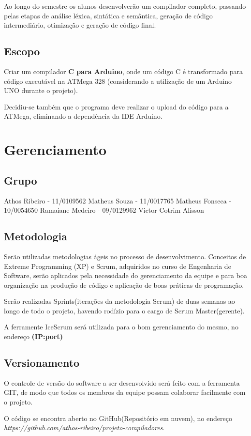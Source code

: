 \documentclass{abnt}
\begin{document}
    Ao longo do semestre os alunos desenvolverão um compilador completo, passando pelas etapas de análise léxica, sintática e semântica, geração de código intermediário, otimização e geração de código final.
    \section{Escopo}
Criar um compilador \textbf{C para Arduino}, onde um código C é transformado para código executável na ATMega 328 (considerando a utilização de um Arduino UNO durante o projeto).

Decidiu-se também que o programa deve realizar o upload do código para a ATMega, eliminando a dependência da IDE Arduino.

\chapter{Gerenciamento}
\section{Grupo}
    Athos Ribeiro - 11/0109562
    Matheus Souza - 11/0017765
    Matheus Fonseca - 10/0054650
    Ramaiane Medeiro - 09/0129962
    Victor Cotrim
    Alisson

\section{Metodologia}
Serão utilizadas metodologias ágeis no processo de desenvolvimento. Conceitos de Extreme Programming (XP) e Scrum, adquiridos no curso de Engenharia de Software, serão aplicados  pela necessidade do gerenciamento da equipe e para boa organização na produção de código e aplicação de boas práticas de programação.

Serão realizadas Sprints(iterações da metodologia Scrum) de duas semanas ao longo de todo o projeto, havendo rodízio para o cargo de Scrum Master(gerente).

A ferramente IceScrum será utilizada para o bom gerenciamento do mesmo, no endereço \textbf{(IP:port)}
\section{Versionamento}
O controle de versão do software a ser desenvolvido será feito com a ferramenta GIT, de modo que todos os membros da equipe possam colaborar facilmente com o projeto.

O código se encontra aberto no GitHub(Repositório em nuvem), no endereço \textit{https://github.com/athos-ribeiro/projeto-compiladores}.
\end{document}

